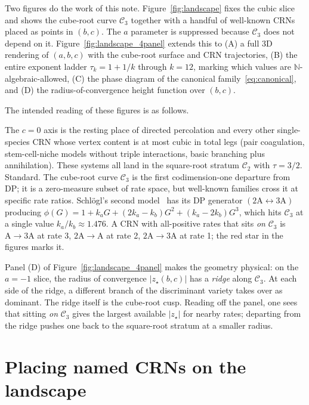 \documentclass[11pt,a4paper]{article}
\newcommand{\NN}{\mathbb{N}}
\newcommand{\Ck}{\mathcal{C}}
\theoremstyle{plain}
\theoremstyle{remark}
\begin{document}
Two figures do the work of this note.
Figure~\ref{fig:landscape} fixes the cubic slice and shows the
cube-root curve $\Ck_{3}$ together with a handful of well-known
CRNs placed as points in $(b,c)$.  The $a$ parameter is
suppressed because $\Ck_{3}$ does not depend on it.
Figure~\ref{fig:landscape_4panel} extends this to (A) a full
3D rendering of $(a,b,c)$ with the cube-root surface and CRN
trajectories, (B) the entire exponent ladder
$\tau_{k} = 1+1/k$ through $k=12$, marking which values are
$\NN$-algebraic-allowed, (C) the phase diagram of the canonical
family~\eqref{eq:canonical}, and (D) the radius-of-convergence
height function over $(b,c)$.

The intended reading of these figures is as follows.

The $c=0$ axis is the resting place of directed percolation and
every other single-species CRN whose vertex content is at most
cubic in total legs (pair coagulation, stem-cell-niche models
without triple interactions, basic branching plus annihilation).
These systems all land in the square-root stratum $\Ck_{2}$ with
$\tau=3/2$.  Standard.  The cube-root curve $\Ck_{3}$ is the
first codimension-one departure from DP; it is a zero-measure
subset of rate space, but well-known families cross it at
specific rate ratios.  Schlögl's second
model~\citep{Schlogl1972} has its DP generator
$(2\mathrm{A}\leftrightarrow 3\mathrm{A})$ producing
$\phi(G) = 1 + k_{a}G + (2k_{a}-k_{b})G^{2} + (k_{a}-2k_{b})G^{3}$,
which hits $\Ck_{3}$ at a single value $k_{a}/k_{b}\approx
1.476$.  A CRN with all-positive rates that sits \emph{on}
$\Ck_{3}$ is $\mathrm{A}\to 3\mathrm{A}$ at rate 3,
$2\mathrm{A}\to\mathrm{A}$ at rate 2, $2\mathrm{A}\to 3\mathrm{A}$
at rate 1; the red star in the figures marks it.

Panel (D) of Figure~\ref{fig:landscape_4panel} makes the
geometry physical: on the $a=-1$ slice, the radius of
convergence $|z_{\star}(b,c)|$ has a \emph{ridge} along
$\Ck_{3}$.  At each side of the ridge, a different branch of
the discriminant variety takes over as dominant.  The ridge
itself is the cube-root cusp.  Reading off the panel, one sees
that sitting \emph{on} $\Ck_{3}$ gives the largest available
$|z_{\star}|$ for nearby rates; departing from the ridge pushes
one back to the square-root stratum at a smaller radius.

\section{Placing named CRNs on the landscape}
\label{sec:placing}
\end{document}
